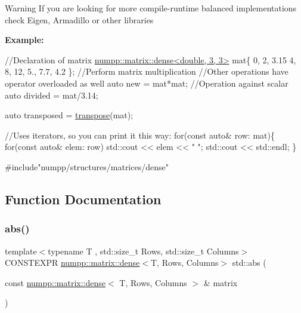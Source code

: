 {\bfseries {\bfseries \begin{DoxyWarning}{Warning}
If you are looking for more compile-\/runtime balanced implementations check Eigen, Armadillo or other libraries
\end{DoxyWarning}
{\bfseries Example\+:} 
\begin{DoxyCode}
\textcolor{comment}{//Declaration of matrix}
\hyperlink{classnumpp_1_1matrix_1_1dense}{numpp::matrix::dense<double, 3, 3>} mat\{
                                              0,  2,   3.15
                                              4,  8,   12,
                                              5., 7.7, 4.2
                                              \};
\textcolor{comment}{//Perform matrix multiplication}
\textcolor{comment}{//Other operations have operator overloaded as well}
\textcolor{keyword}{auto} \textcolor{keyword}{new} = mat*mat;
\textcolor{comment}{//Operation against scalar}
\textcolor{keyword}{auto} divided = mat/3.14;

\textcolor{keyword}{auto} transposed = \hyperlink{group__numpp__structures__matrices__dense_ga07f80d900be174247ad3a3c42e9244fd}{transpose}(mat);

\textcolor{comment}{//Uses iterators, so you can print it this way:}
\textcolor{keywordflow}{for}(\textcolor{keyword}{const} \textcolor{keyword}{auto}& row: mat)\{
  \textcolor{keywordflow}{for}(\textcolor{keyword}{const} \textcolor{keyword}{auto}& elem: row)
    std::cout << elem << \textcolor{stringliteral}{" "};
  std::cout << std::endl;
\}
\end{DoxyCode}
}}

{\bfseries {\bfseries 
\begin{DoxyCode}
\textcolor{preprocessor}{#include"numpp/structures/matrices/dense"}
\end{DoxyCode}
 }}

\subsection{Function Documentation}
\mbox{\label{group__numpp__structures__matrices__dense_gaa1377585547eae134c6ce13018e08a6b}} 
\subsubsection{\texorpdfstring{abs()}{abs()}}
{\footnotesize\ttfamily template$<$typename T , std\+::size\+\_\+t Rows, std\+::size\+\_\+t Columns$>$ \\
C\+O\+N\+S\+T\+E\+X\+PR \hyperlink{classnumpp_1_1matrix_1_1dense}{numpp\+::matrix\+::dense}$<$T, Rows, Columns$>$ std\+::abs (\begin{DoxyParamCaption}\item[{const \hyperlink{classnumpp_1_1matrix_1_1dense}{numpp\+::matrix\+::dense}$<$ T, Rows, Columns $>$ \&}]{matrix }\end{DoxyParamCaption})}

